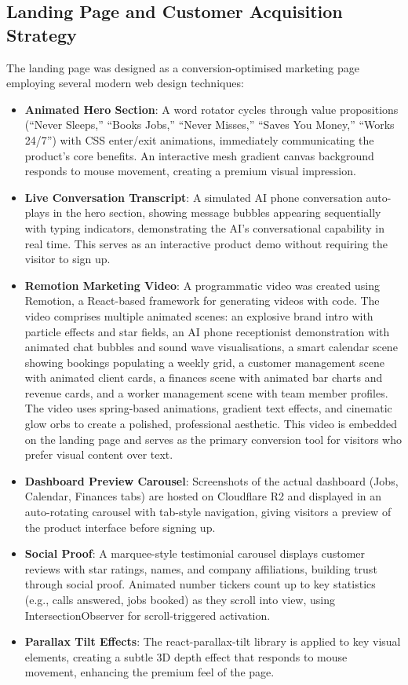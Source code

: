 \documentclass[conference]{IEEEtran}
\begin{document}
\subsection{Landing Page and Customer Acquisition Strategy}

The landing page was designed as a conversion-optimised marketing page employing several modern web design techniques:

\begin{itemize}
\item \textbf{Animated Hero Section}: A word rotator cycles through value propositions (``Never Sleeps,'' ``Books Jobs,'' ``Never Misses,'' ``Saves You Money,'' ``Works 24/7'') with CSS enter/exit animations, immediately communicating the product's core benefits. An interactive mesh gradient canvas background responds to mouse movement, creating a premium visual impression.
\item \textbf{Live Conversation Transcript}: A simulated AI phone conversation auto-plays in the hero section, showing message bubbles appearing sequentially with typing indicators, demonstrating the AI's conversational capability in real time. This serves as an interactive product demo without requiring the visitor to sign up.
\item \textbf{Remotion Marketing Video}: A programmatic video was created using Remotion, a React-based framework for generating videos with code. The video comprises multiple animated scenes: an explosive brand intro with particle effects and star fields, an AI phone receptionist demonstration with animated chat bubbles and sound wave visualisations, a smart calendar scene showing bookings populating a weekly grid, a customer management scene with animated client cards, a finances scene with animated bar charts and revenue cards, and a worker management scene with team member profiles. The video uses spring-based animations, gradient text effects, and cinematic glow orbs to create a polished, professional aesthetic. This video is embedded on the landing page and serves as the primary conversion tool for visitors who prefer visual content over text.
\item \textbf{Dashboard Preview Carousel}: Screenshots of the actual dashboard (Jobs, Calendar, Finances tabs) are hosted on Cloudflare R2 and displayed in an auto-rotating carousel with tab-style navigation, giving visitors a preview of the product interface before signing up.
\item \textbf{Social Proof}: A marquee-style testimonial carousel displays customer reviews with star ratings, names, and company affiliations, building trust through social proof. Animated number tickers count up to key statistics (e.g., calls answered, jobs booked) as they scroll into view, using IntersectionObserver for scroll-triggered activation.
\item \textbf{Parallax Tilt Effects}: The react-parallax-tilt library is applied to key visual elements, creating a subtle 3D depth effect that responds to mouse movement, enhancing the premium feel of the page.
\end{itemize}
\end{document}
